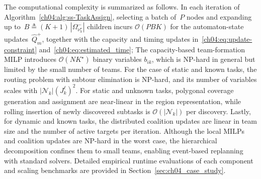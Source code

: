 The computational complexity is summarized as follows.
{In each iteration of Algorithm~\ref{ch04:alg:ss-TaskAssign}, selecting a batch of~$P$
nodes and expanding up to~$B \triangleq (K{+}1)\,|\Omega^-_{\nu_h^\star}|$
children incurs $\mathcal{O}(PBK)$ for the automaton-state
updates~$\widehat{Q}^+_m$, together with the capacity and timing
updates in~\eqref{ch04:eq:update-constraint} and~\eqref{ch04:eq:estimated_time};
 The capacity-based
team-formation MILP introduces $\mathcal{O}(N K^\star)$ binary variables $b_{ik}$,
which is NP-hard in general but limited by the small number of teams.
For the case of static and known tasks, the
routing problem with subtour elimination is NP-hard,
and its number of variables scales with $|\mathcal{N}_k|(J_k^\ell)^2$.
For static and unknown tasks,
polygonal coverage generation and assignment are near-linear in the region
representation, while rolling insertion of newly discovered subtasks is
$\mathcal{O}(|\mathcal{N}_k|)$ per discovery. Lastly, for dynamic and known tasks, the
distributed coalition updates are linear in
team size and the number of active targets per iteration.
Although the
local MILPs and coalition updates are NP-hard in the worst case, the hierarchical
decomposition confines them to small teams, enabling event-based
replanning with standard solvers.
Detailed empirical runtime evaluations of each component and scaling benchmarks
are provided in Section~\ref{sec:ch04_case_study}.}
